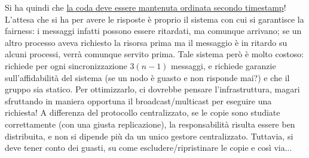 Si ha quindi che \underline{la coda deve essere mantenuta ordinata secondo timestamp}!
L'attesa che si ha per avere le risposte è proprio il sistema con cui si garantisce la fairness: i messaggi infatti
possono essere ritardati, ma comunque arrivano; se un altro processo aveva richiesto la risorsa prima ma il messaggio
è in ritardo su alcuni processi, verrà comunque servito prima.
Tale sistema però è molto costoso: richiede per ogni sincronizzazione $3(n-1)$ messaggi, e richiede garanzie
sull'affidabilità del sistema (se un nodo è guasto e non risponde mai?) e che il gruppo sia statico. Per ottimizzarlo,
ci dovrebbe pensare l'infrastruttura, magari sfruttando in maniera opportuna il broadcast/multicast per eseguire una
richiesta!
A differenza del protocollo centralizzato, se le copie sono studiate correttamente (con una giusta replicazione), la
responsabilità risulta essere ben distribuita, e non si dipende più da un unico gestore centralizzato. Tuttavia, si
deve tener conto dei guasti, su come escludere/ripristinare le copie e così via...

